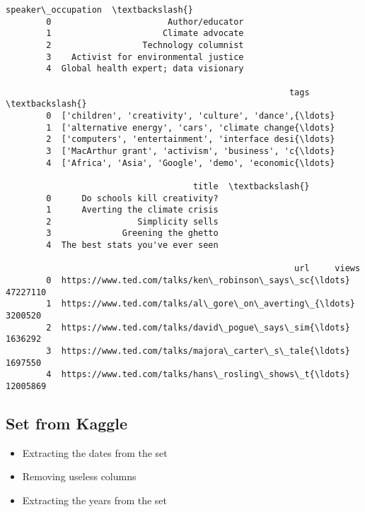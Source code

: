 \documentclass[11pt]{article}
\providecommand{\tightlist}{%
      \setlength{\itemsep}{0pt}\setlength{\parskip}{0pt}}
\begin{document}
\begin{Verbatim}[commandchars=\\\{\}]
                             speaker\_occupation  \textbackslash{}
        0                       Author/educator   
        1                      Climate advocate   
        2                  Technology columnist   
        3    Activist for environmental justice   
        4  Global health expert; data visionary   
        
                                                        tags  \textbackslash{}
        0  ['children', 'creativity', 'culture', 'dance',{\ldots}   
        1  ['alternative energy', 'cars', 'climate change{\ldots}   
        2  ['computers', 'entertainment', 'interface desi{\ldots}   
        3  ['MacArthur grant', 'activism', 'business', 'c{\ldots}   
        4  ['Africa', 'Asia', 'Google', 'demo', 'economic{\ldots}   
        
                                     title  \textbackslash{}
        0      Do schools kill creativity?   
        1      Averting the climate crisis   
        2                 Simplicity sells   
        3              Greening the ghetto   
        4  The best stats you've ever seen   
        
                                                         url     views  
        0  https://www.ted.com/talks/ken\_robinson\_says\_sc{\ldots}  47227110  
        1  https://www.ted.com/talks/al\_gore\_on\_averting\_{\ldots}   3200520  
        2  https://www.ted.com/talks/david\_pogue\_says\_sim{\ldots}   1636292  
        3  https://www.ted.com/talks/majora\_carter\_s\_tale{\ldots}   1697550  
        4  https://www.ted.com/talks/hans\_rosling\_shows\_t{\ldots}  12005869  
\end{Verbatim}
            
    \subsection{Set from Kaggle}\label{set-from-kaggle}

\begin{itemize}
\tightlist
\item
  Extracting the dates from the set
\item
  Removing useless columns
\item
  Extracting the years from the set
\end{itemize}
\end{document}
